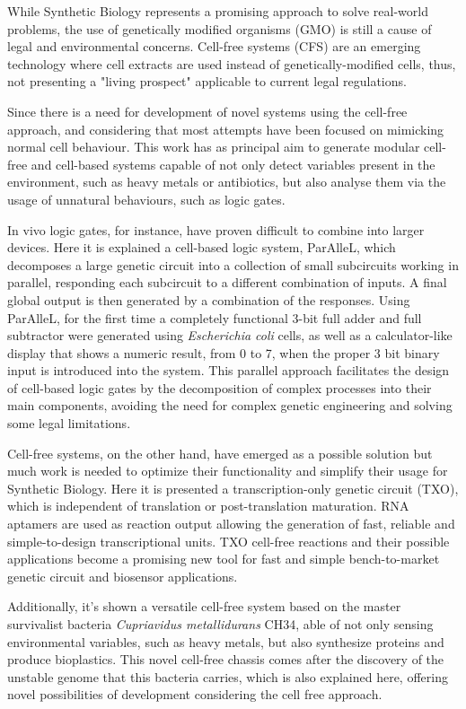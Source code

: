 While Synthetic Biology represents a promising approach to solve real-world problems, 
the use of genetically modified organisms (GMO) is still a cause of legal and environmental concerns. 
Cell-free systems (CFS) are an emerging technology where cell extracts are used instead of genetically-modified cells, 
thus, not presenting a "living prospect" applicable to current legal regulations.

Since there is a need for development of novel systems using the cell-free approach, and considering that most attempts have
been focused on mimicking normal cell behaviour. This work has as principal aim to generate modular cell-free and cell-based 
systems capable of not only detect variables present in the environment, such as heavy metals or antibiotics, but also analyse
 them via the usage of unnatural behaviours, such as logic gates.

In vivo logic gates, for instance, have proven difficult to combine into larger devices. 
Here it is explained a cell-based logic system, ParAlleL, which decomposes a large genetic circuit 
into a collection of small subcircuits working in parallel, responding each subcircuit to a different combination of inputs. 
A final global output is then generated by a combination of the responses. Using ParAlleL, for the first time a completely
functional 3-bit full adder and full subtractor were generated using \textit{Escherichia coli} cells, as well as a calculator-like
display that shows a numeric result, from 0 to 7, when the proper 3 bit binary input is introduced into the system. 
This parallel approach facilitates the design of cell-based logic gates by the decomposition of complex processes into their main
components, avoiding the need for complex genetic engineering and solving some legal limitations.

Cell-free systems, on the other hand, have emerged as a possible solution but much work is needed to optimize their functionality 
and simplify their usage for Synthetic Biology. Here it is presented a transcription-only genetic circuit (TXO), which is independent
of translation or post-translation maturation. RNA aptamers are used as reaction output allowing the generation of fast, reliable and
simple-to-design transcriptional units. TXO cell-free reactions and their possible applications become a promising new tool for fast
and simple bench-to-market genetic circuit and biosensor applications.

Additionally, it's shown a versatile cell-free system based on the master survivalist bacteria \textit{Cupriavidus  metallidurans} CH34,
able of not only sensing environmental variables, such as heavy metals, but also synthesize proteins and produce bioplastics. This novel 
cell-free  chassis  comes after the discovery of the unstable genome that this bacteria carries, which is also explained here, offering 
novel possibilities of development considering the cell free approach.